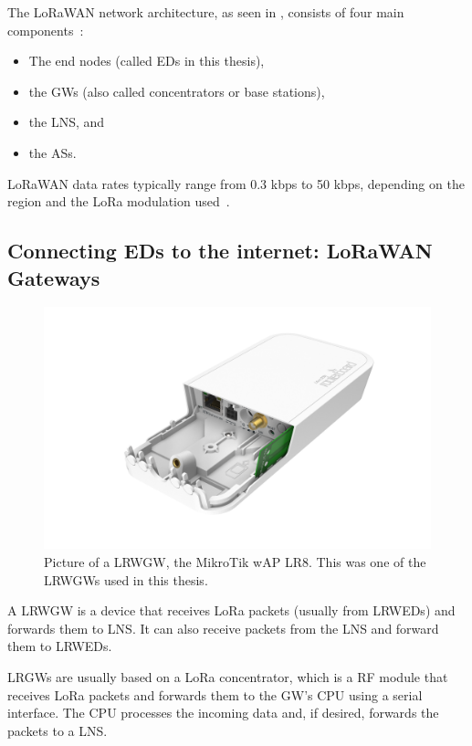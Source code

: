 The \ac{LoRaWAN} network architecture, as seen in , consists of four main components~\cite[p. 8]{lora_alliance_inc_lorawan_specification_2017}:

\begin{itemize}
    \item The end nodes (called \aclp{ED} in this thesis),
    \item the \aclp{GW} (also called concentrators or base stations),
    \item the \acf{LNS}, and
    \item the \acfp{AS}.
\end{itemize}

\ac{LoRaWAN} data rates typically range from 0.3 kbps to 50 kbps, depending on the region and the \ac{LoRa} modulation used~\cite[p. 8]{lora_alliance_inc_lorawan_specification_2017}.

\subsection{Connecting \aclp{ED} to the internet: \acs{LoRaWAN} Gateways}\label{sec:gateways}

\begin{figure}[htbp]
    \centering
    \includegraphics[width=.6\textwidth]{pictures/hardware/gateways/mikrotik-lr8-kit.png}
    \caption[Picture of a \acl{LRWGW}]{
        Picture of a \acl{LRWGW}, the MikroTik wAP LR8.
        This was one of the \aclp{LRWGW} used in this thesis.~\protect\cite{the_things_industries_bv_lorawan_nodate}
    }\label{pic:mikrotik-lr8-kit-gateway}
\end{figure}

A \acl{LRWGW} is a device that receives \ac{LoRa} packets (usually from \aclp{LRWED}) and forwards them to \ac{LNS}.
It can also receive packets from the \ac{LNS} and forward them to \aclp{LRWED}.

\aclp{LRGW} are usually based on a \ac{LoRa} concentrator, which is a \ac{RF} module that receives \ac{LoRa} packets and forwards them to the \acl{GW}'s \ac{CPU} using a serial interface.
The \ac{CPU} processes the incoming data and, if desired, forwards the packets to a \ac{LNS}.

